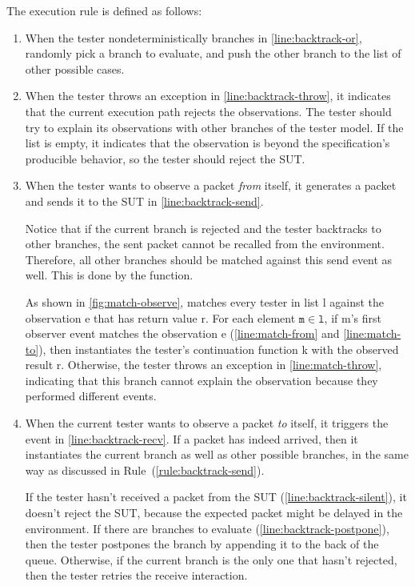 The execution rule is defined as follows:
\begin{enumerate}
\item When the tester nondeterministically branches
  in \autoref{line:backtrack-or}, randomly pick a branch  to
  evaluate, and push the other branch  to the list of other
  possible cases.

\item When the  tester throws an exception in
  \autoref{line:backtrack-throw}, it indicates that the current execution path
  rejects the observations.  The tester should try to explain its observations
  with other branches of the tester model.  If the  list is empty,
  it indicates that the observation is beyond the specification's producible
  behavior, so the tester should reject the SUT.

\item When the tester wants to observe a packet {\em from} itself, it generates
  a packet and sends it to the SUT in \autoref{line:backtrack-send}.

  Notice that if the current branch is rejected and the tester backtracks to
  other branches, the sent packet cannot be recalled from the environment.
  Therefore, all other branches should be matched against this send event as
  well.  This is done by the  function.
  
  As shown in \autoref{fig:match-observe},  matches every
  tester in list \ilc l against the observation \ilc e that has return
  value \ilc r.  For each element $\texttt m\in\texttt l$, if \ilc m's first
  observer event  matches the observation \ilc e
  (\autoref{line:match-from} and \autoref{line:match-to}),
  then  instantiates the tester's continuation function \ilc
  k with the observed result \ilc r.  Otherwise, the tester throws an exception
  in \autoref{line:match-throw}, indicating that this branch cannot explain the
  observation because they performed different events.
  \label{rule:backtrack-send}

\item When the current tester wants to observe a packet {\em to} itself, it
  triggers the  event in \autoref{line:backtrack-recv}.  If a
  packet has indeed arrived, then it instantiates the current branch as well as
  other possible branches, in the same way as discussed
  in Rule~(\ref{rule:backtrack-send}).

  If the tester hasn't received a packet from the SUT
  (\autoref{line:backtrack-silent}), it doesn't reject the SUT, because the
  expected packet might be delayed in the environment.  If there are 
  branches to evaluate (\autoref{line:backtrack-postpone}), then the tester
  postpones the  branch by appending it to the back of the queue.
  Otherwise, if the current branch is the only one that hasn't rejected, then
  the tester retries the receive interaction.


\end{enumerate}
